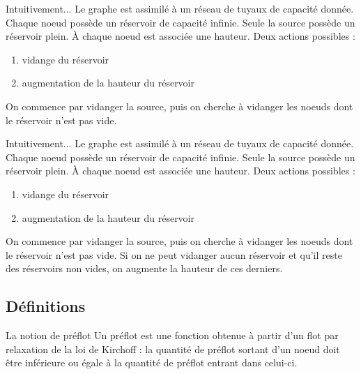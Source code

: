 \begin{frame}{Intuitivement...}
	Le graphe est assimilé à un réseau de tuyaux de capacité donnée.\vfill
	Chaque noeud possède un réservoir de capacité infinie.\vfill
	Seule la source possède un réservoir plein. \vfill
	À chaque noeud est associée une hauteur.\vfill
	Deux actions possibles : \begin{enumerate}
		\item vidange du réservoir
		\item augmentation de la hauteur du réservoir
	\end{enumerate} \vfill
	On commence par vidanger la source, puis on cherche à vidanger les noeuds dont le réservoir n'est
	pas vide. \vfill
\end{frame}

\begin{frame}{Intuitivement...}
	Le graphe est assimilé à un réseau de tuyaux de capacité donnée.\vfill
	Chaque noeud possède un réservoir de capacité infinie.\vfill
	Seule la source possède un réservoir plein. \vfill
	À chaque noeud est associée une hauteur.\vfill
	Deux actions possibles : \begin{enumerate}
		\item vidange du réservoir
		\item augmentation de la hauteur du réservoir
	\end{enumerate} \vfill
	On commence par vidanger la source, puis on cherche à vidanger les noeuds dont le réservoir n'est
	pas vide. \vfill
	Si on ne peut vidanger aucun réservoir et qu'il reste des réservoirs non vides, on augmente la
	hauteur de ces derniers. \vfill
\end{frame}


\subsection{Définitions}
\begin{frame}{La notion de préflot}
	Un préflot est une fonction obtenue à partir d'un flot par relaxation de la loi de Kirchoff : la
	quantité de préflot sortant d'un noeud doit être inférieure ou égale à la quantité de préflot
	entrant dans celui-ci.\vfill
\end{frame}

